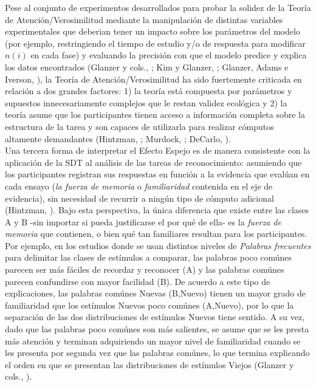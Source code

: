 Pese al conjunto de experimentos desarrollados para probar la solidez de la Teoría de Atención/Verosimilitud mediante la manipulación de distintas variables experimentales que deberian tener un impacto sobre los parámetros del modelo (por ejemplo, restringiendo el tiempo de estudio y/o de respuesta para modificar $n(i)$ en cada fase) y evaluando la precisión con que el modelo predice y explica los datos encontrados (Glanzer y cols., \citeyear{Glanzer1993}; Kim y Glanzer, \citeyear{Kim1993}; Glanzer, Adams e Iverson, \citeyear{Glanzer1991}), la Teoría de Atención/Verosimilitud ha sido fuertemente criticada en relación a dos grandes factores: 1) la teoría está compuesta por parámetros y supuestos innecesariamente complejos que le restan validez ecológica y 2) la teoría asume que los participantes tienen acceso a información completa sobre la estructura de la tarea y son capaces de utilizarla para realizar cómputos altamente demandantes (Hintzman, \citeyear{Hintzman1994}; Murdock, \citeyear{Murdock1998}; DeCarlo, \citeyear{DeCarlo2007}).\\

Una tercera forma de interpretar el Efecto Espejo es de manera consistente con la aplicación de la SDT al análisis de las tareas de reconocimiento: asumiendo que los participantes registran sus respuestas en función a la evidencia que evalúan en cada ensayo (\textit{la fuerza de memoria} o \textit{familiaridad} contenida en el eje de evidencia), sin necesidad de recurrir a ningún tipo de cómputo adicional (Hintzman, \citeyear{Hintzman1994}). Bajo esta perspectiva, la única diferencia que existe entre las clases A y B -sin importar si pueda justificarse el por qué de ella- es la \textit{fuerza de memoria} que contienen, o bien qué tan familiares resultan para los participantes. Por ejemplo, en los estudios donde se usan distintos niveles de \textit{Palabras frecuentes} para delimitar las clases de estímulos a comparar, las palabras poco comúnes parecen ser más fáciles de recordar y reconocer (A) y las palabras comúnes parecen confundirse con mayor facilidad (B). De acuerdo a este tipo de explicaciones, las palabras comúnes Nuevas (B,Nuevo) tienen un mayor grado de familiaridad que los estímulos Nuevos poco comúnes (A,Nuevo), por lo que la separación de las dos distribuciones de estímulos Nuevos tiene sentido. A su vez, dado que las palabras poco comúnes son más salientes, se asume que se les presta más atención y terminan adquiriendo un mayor nivel de familiaridad cuando se les presenta por segunda vez que las palabras comúnes, lo que termina explicando el orden en que se presentan las distribuciones de estímulos Viejos (Glanzer y cols., \citeyear{Glanzer1993}).\\

